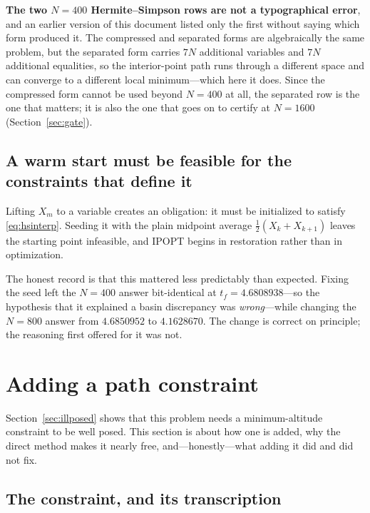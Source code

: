 \documentclass[11pt]{article}
\begin{document}
\textbf{The two $N = 400$ Hermite--Simpson rows are not a typographical
error}, and an earlier version of this document listed only the first without
saying which form produced it. The compressed and separated forms are
algebraically the same problem, but the separated form carries $7N$ additional
variables and $7N$ additional equalities, so the interior-point path runs through
a different space and can converge to a different local minimum---which here it
does. Since the compressed form cannot be used beyond $N = 400$ at all, the
separated row is the one that matters; it is also the one that goes on to
certify at $N = 1600$ (Section~\ref{sec:gate}).

\subsection{A warm start must be feasible for the constraints that define it}

Lifting $X_m$ to a variable creates an obligation: it must be initialized to
satisfy \eqref{eq:hsinterp}. Seeding it with the plain midpoint average
$\tfrac{1}{2}(X_k + X_{k+1})$ leaves the starting point infeasible, and IPOPT
begins in restoration rather than in optimization.

The honest record is that this mattered less predictably than expected. Fixing
the seed left the $N = 400$ answer bit-identical at $t_f = 4.6808938$---so the
hypothesis that it explained a basin discrepancy was \emph{wrong}---while
changing the $N = 800$ answer from $4.6850952$ to $4.1628670$. The change is
correct on principle; the reasoning first offered for it was not.

\section{Adding a path constraint}
\label{sec:pathcon}

Section~\ref{sec:illposed} shows that this problem needs a minimum-altitude
constraint to be well posed. This section is about how one is added, why the
direct method makes it nearly free, and---honestly---what adding it did and did
not fix.

\subsection{The constraint, and its transcription}
\end{document}
